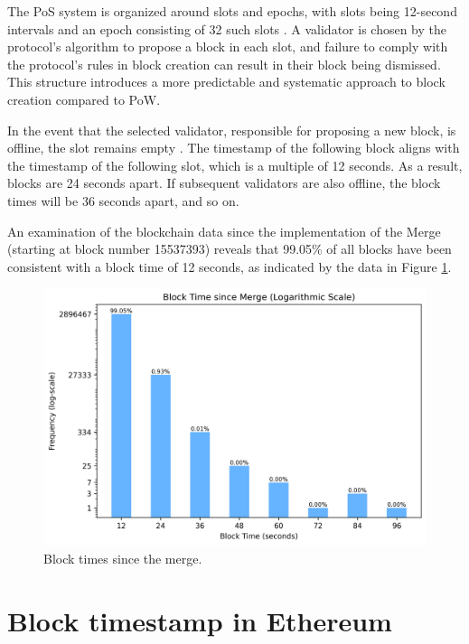 The PoS system is organized around slots and epochs, with slots being 12-second
intervals and an epoch consisting of 32 such slots
\cite{seconds-per-slot-mainnet}\cite{seconds-per-slot-mainnet-doc}. A validator
is chosen by
the protocol's algorithm to propose a block in each slot, and failure to comply
with the protocol's rules in block creation can result in their block being
dismissed. This structure introduces a more predictable and systematic approach
to block creation compared to PoW.

In the event that the selected validator, responsible for proposing a new block,
is offline, the slot remains empty \cite{validator-offline}. The timestamp of
the following block aligns with the timestamp of the following slot, which is a
multiple of 12 seconds. As a result, blocks are 24 seconds
apart. If subsequent validators are also offline, the block times will be 36
seconds apart, and so on.

An examination of the blockchain data since the implementation of the Merge
(starting at block number 15537393) reveals that 99.05\% of all blocks have been
consistent with a block time of 12 seconds, as indicated by the data in Figure
\ref{fig:block_time_analysis}.

\begin{figure}[H]
  \centering
  \includegraphics[width=1\textwidth]{block_time_analysis/pos_block_time_bar_chart_with_percentages.png}
  \caption{Block times since the merge.}
  \label{fig:block_time_analysis}
\end{figure}

\section{Block timestamp in Ethereum}
